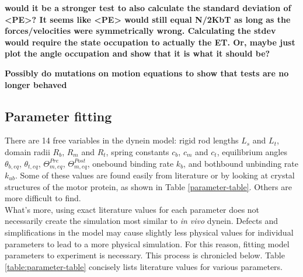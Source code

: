 \documentclass[10pt]{article} %
\begin{document}
\textbf{would it be a stronger test to also calculate the standard deviation of <PE>? It seems like <PE> would still equal N/2KbT as long as the forces/velocities were symmetrically wrong. Calculating the stdev would require the state occupation to actually the ET. Or, maybe just plot the angle occupation and show that it is what it should be?}

\textbf{Possibly do mutations on motion equations to show that tests are no longer behaved}

\subsection{Parameter fitting}
There are 14 free variables in the dynein model: rigid rod lengths $L_s$ and $L_t$, domain radii $R_b$, $R_m$ and $R_t$, spring constants $c_b$, $c_m$ and $c_t$, equilibrium angles $\theta_{b,eq}$, $\theta_{t,eq}$, $\Theta_{m,eq}^{Pre}$, $\Theta_{m,eq}^{Post}$, onebound binding rate $k_b$, and bothbound unbinding rate $k_{ub}$. Some of these values are found easily from literature or by looking at crystal structures of the motor protein, as shown in Table \ref{parameter-table}. Others are more difficult to find.\\

What's more, using exact literature values for each parameter does not necessarily create the simulation most similar to \textit{in vivo} dynein. Defects and simplifications in the model may cause slightly less physical values for individual parameters to lead to a more physical simulation. For this reason, fitting model parameters to experiment is necessary. This process is chronicled below. Table \ref{table:parameter-table} concisely lists literature values for various parameters.
\end{document}
